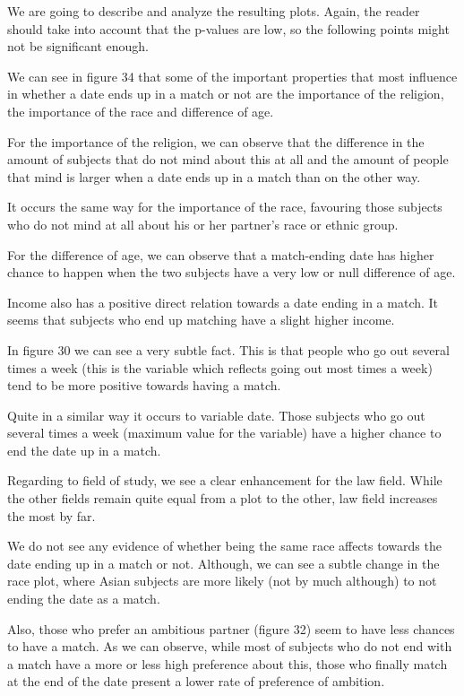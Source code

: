 \newpage
We are going to describe and analyze the resulting plots. Again, the reader should take into account that the p-values are low, so the following points might not be significant enough.

We can see in figure 34 that some of the important properties that most influence in whether a date ends up in a match or not are the importance of the religion, the importance of the race and difference of age.

For the importance of the religion, we can observe that the difference in the amount of subjects that do not mind about this at all and the amount of people that mind is larger when a date ends up in a match than on the other way.

It occurs the same way for the importance of the race, favouring those subjects who do not mind at all about his or her partner's race or ethnic group.

For the difference of age, we can observe that a match-ending date has higher chance to happen when the two subjects have a very low or null difference of age.

Income also has a positive direct relation towards a date ending in a match. It seems that subjects who end up matching have a slight higher income.

In figure 30 we can see a very subtle fact. This is that people who go out several times a week (this is the variable which reflects going out most times a week) tend to be more positive towards having a match.

Quite in a similar way it occurs to variable date. Those subjects who go out several times a week (maximum value for the variable) have a higher chance to end the date up in a match.

Regarding to field of study, we see a clear enhancement for the law field. While the other fields remain quite equal from a plot to the other, law field increases the most by far.

We do not see any evidence of whether being the same race affects towards the date ending up in a match or not. Although, we can see a subtle change in the race plot, where Asian subjects are more likely (not by much although) to not ending the date as a match.

Also, those who prefer an ambitious partner (figure 32) seem to have less chances to have a match. As we can observe, while most of subjects who do not end with a match have a more or less high preference about this, those who finally match at the end of the date present a lower rate of preference of ambition.
\newline\newline


